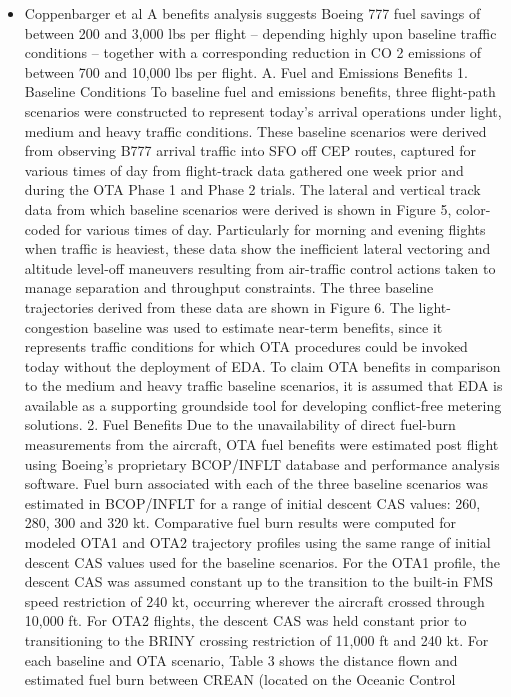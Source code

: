 \documentclass{aer1315-pretty}
\begin{document}
\begin{itemize}
\item Coppenbarger et al \cite{Copp:2007} 
A benefits analysis suggests Boeing 777 fuel savings of between 200 and 3,000 lbs per flight – depending highly upon baseline traffic conditions – together with a corresponding reduction in CO 2 emissions of between 700 and 10,000 lbs per flight.
A. Fuel and Emissions Benefits
    1.  Baseline Conditions
    To baseline fuel and emissions benefits, three flight-path scenarios were constructed to represent today’s arrival
operations under light, medium and heavy traffic conditions. These baseline scenarios were derived from observing
B777 arrival traffic into SFO off CEP routes, captured for various times of day from flight-track data gathered one
week prior and during the OTA Phase 1 and Phase 2 trials. The lateral and vertical track data from which baseline
scenarios were derived is shown in Figure 5, color-coded for various times of day. Particularly for morning and
evening flights when traffic is heaviest, these data show the inefficient lateral vectoring and altitude level-off
maneuvers resulting from air-traffic control actions taken to manage separation and throughput constraints. The
three baseline trajectories derived from these data are shown in Figure 6. The light-congestion baseline was used to
estimate near-term benefits, since it represents traffic conditions for which OTA procedures could be invoked today
without the deployment of EDA. To claim OTA benefits in comparison to the medium and heavy traffic baseline
scenarios, it is assumed that EDA is available as a supporting groundside tool for developing conflict-free metering
solutions.
    2.   Fuel Benefits
    Due to the unavailability of direct fuel-burn measurements from the aircraft, OTA fuel benefits were estimated
post flight using Boeing’s proprietary BCOP/INFLT database and performance analysis software. Fuel burn
associated with each of the three baseline scenarios was estimated in BCOP/INFLT for a range of initial descent
CAS values: 260, 280, 300 and 320 kt. Comparative fuel burn results were computed for modeled OTA1 and OTA2
trajectory profiles using the same range of initial descent CAS values used for the baseline scenarios. For the OTA1
profile, the descent CAS was assumed constant up to the transition to the built-in FMS speed restriction of 240 kt,
occurring wherever the aircraft crossed through 10,000 ft. For OTA2 flights, the descent CAS was held constant
prior to transitioning to the BRINY crossing restriction of 11,000 ft and 240 kt. For each baseline and OTA scenario,
Table 3 shows the distance flown and estimated fuel burn between CREAN (located on the Oceanic Control

\end{itemize}
\end{document}
